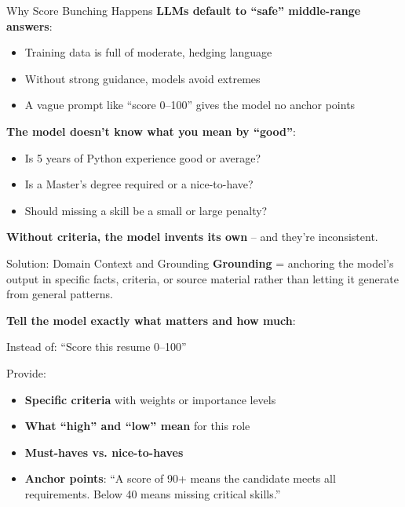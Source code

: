 \documentclass[aspectratio=169]{beamer}
\begin{document}
\begin{frame}{Why Score Bunching Happens}
\textbf{LLMs default to ``safe'' middle-range answers}:
\begin{itemize}
    \item Training data is full of moderate, hedging language
    \item Without strong guidance, models avoid extremes
    \item A vague prompt like ``score 0--100'' gives the model no anchor points
\end{itemize}
\vspace{0.3cm}

\textbf{The model doesn't know what you mean by ``good''}:
\begin{itemize}
    \item Is 5 years of Python experience good or average?
    \item Is a Master's degree required or a nice-to-have?
    \item Should missing a skill be a small or large penalty?
\end{itemize}
\vspace{0.3cm}

\textbf{Without criteria, the model invents its own} -- and they're inconsistent.
\end{frame}

\begin{frame}{Solution: Domain Context and Grounding}
\textbf{Grounding} = anchoring the model's output in specific facts, criteria, or source material rather than letting it generate from general patterns.
\vspace{0.3cm}

\textbf{Tell the model exactly what matters and how much}:
\vspace{0.2cm}

Instead of: ``Score this resume 0--100''
\vspace{0.2cm}

Provide:
\begin{itemize}
    \item \textbf{Specific criteria} with weights or importance levels
    \item \textbf{What ``high'' and ``low'' mean} for this role
    \item \textbf{Must-haves vs. nice-to-haves}
    \item \textbf{Anchor points}: ``A score of 90+ means the candidate meets all requirements. Below 40 means missing critical skills.''
\end{itemize}
\vspace{0.3cm}

\begin{center}
\end{center}
\end{frame}
\end{document}
